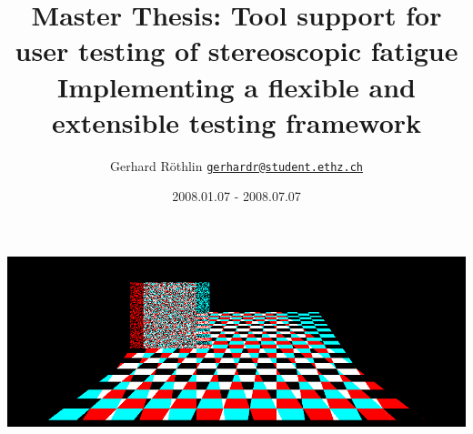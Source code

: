 \documentclass[11pt]{scrartcl}
\title{Master Thesis: Tool support for user testing of stereoscopic fatigue\\
{\large Implementing a flexible and extensible testing framework}}
\author{\normalsize Gerhard R\"othlin 
{\tt  \href{mailto:gerhardr@student.ethz.ch}{gerhardr@student.ethz.ch}}}
\date{2008.01.07 - 2008.07.07}
\begin{document}
\maketitle

\begin{center}
\includegraphics[width=15cm,clip,trim=0cm 0cm 0cm 0cm]{media/title.png}
\end{center}


\begin{multicols}{2}





\end{multicols}

\appendix


\end{document}
